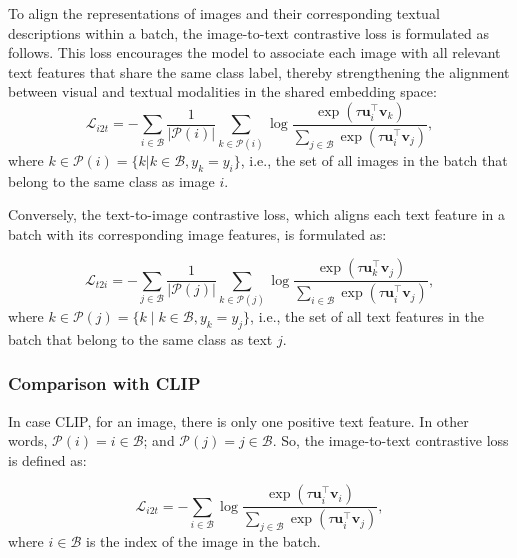 To align the representations of images and their corresponding textual descriptions within a batch, the image-to-text contrastive loss is formulated as follows. This loss encourages the model to associate each image with all relevant text features that share the same class label, thereby strengthening the alignment between visual and textual modalities in the shared embedding space:
\begin{equation} \label{eq:unicl_image_to_text_contrastive_loss}
    \mathcal{L}_{i2t} = - \sum_{i \in \mathcal{B}} \frac{1}{|\mathcal{P}(i)|} \sum_{k \in \mathcal{P}(i)} 
    \log \frac{\exp(\tau \mathbf{u}_i^\top \mathbf{v}_k)}{\sum_{j \in \mathcal{B}} \exp(\tau \mathbf{u}_i^\top \mathbf{v}_j)},
\end{equation}
where $k \in \mathcal{P}(i) = \{k | k \in \mathcal{B}, y_k = y_i\}$, i.e., the set of all images in the batch that belong to the same class as image $i$.

Conversely, the text-to-image contrastive loss, which aligns each text feature in a batch with its corresponding image features, is formulated as:

\begin{equation} \label{eq:unicl_text_to_image_contrastive_loss}
    \mathcal{L}_{t2i} = - \sum_{j \in \mathcal{B}} \frac{1}{|\mathcal{P}(j)|} \sum_{k \in \mathcal{P}(j)} 
    \log \frac{\exp(\tau \mathbf{u}_k^\top \mathbf{v}_j)}{\sum_{i \in \mathcal{B}} \exp(\tau \mathbf{u}_i^\top \mathbf{v}_j)},
\end{equation}
where $k \in \mathcal{P}(j) = \{k \mid k \in \mathcal{B}, y_k = y_j\}$, i.e., the set of all text features in the batch that belong to the same class as text $j$.

\subsubsection{Comparison with CLIP}
\label{subsec:clip_vs_unicl}

In case CLIP, for an image, there is only one positive text feature. In other words, $\mathcal{P}(i) = {i} \in \mathcal{B}$; and $\mathcal{P}(j) = {j} \in \mathcal{B}$. So, the image-to-text contrastive loss is defined as:

\begin{equation} \label{eq:clip_image_to_text_contrastive_loss}
    \mathcal{L}_{i2t} = - \sum_{i \in \mathcal{B}} 
    \log \frac{\exp(\tau \mathbf{u}_i^\top \mathbf{v}_i)}{\sum_{j \in \mathcal{B}} \exp(\tau \mathbf{u}_i^\top \mathbf{v}_j)},
\end{equation}
where $i \in \mathcal{B}$ is the index of the image in the batch.

